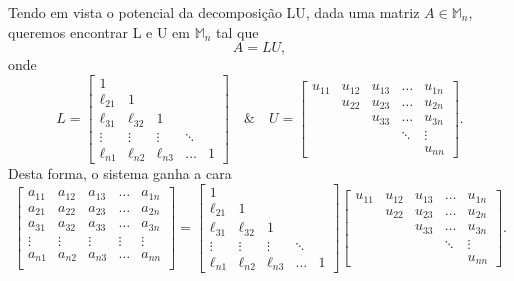 \documentclass[../numerical_methods.tex]{subfiles}
\begin{document}
Tendo em vista o potencial da decomposição LU, dada uma matriz \(A\in \mathbb{M}_{n}\), queremos encontrar L e U em \(\mathbb{M}_{n}\) tal que
\[
	A = LU,
\]
onde
\[
	L = \begin{bmatrix}
		1         &           &           &        &   \\
		\ell_{21} & 1         &           &        &   \\
		\ell_{31} & \ell_{32} & 1         &        &   \\
		\vdots    & \vdots    & \vdots    & \ddots &   \\
		\ell_{n1} & \ell_{n2} & \ell_{n3} & \dotsc & 1
	\end{bmatrix} \quad\&\quad U = \begin{bmatrix}
		u_{11} & u_{12} & u_{13} & \dotsc & u_{1n} \\
		       & u_{22} & u_{23} & \dotsc & u_{2n} \\
		       &        & u_{33} & \dotsc & u_{3n} \\
		       &        &        & \ddots & \vdots \\
		       &        &        &        & u_{nn}
	\end{bmatrix}.
\]
Desta forma, o sistema ganha a cara
\[
	\begin{bmatrix}
		a_{11} & a_{12} & a_{13} & \dotsc & a_{1n} \\
		a_{21} & a_{22} & a_{23} & \dotsc & a_{2n} \\
		a_{31} & a_{32} & a_{33} & \dotsc & a_{3n} \\
		\vdots & \vdots & \vdots & \vdots & \vdots \\
		a_{n1} & a_{n2} & a_{n3} & \dotsc & a_{nn} \\
	\end{bmatrix} =\begin{bmatrix}
		1         &           &           &        &   \\
		\ell_{21} & 1         &           &        &   \\
		\ell_{31} & \ell_{32} & 1         &        &   \\
		\vdots    & \vdots    & \vdots    & \ddots &   \\
		\ell_{n1} & \ell_{n2} & \ell_{n3} & \dotsc & 1
	\end{bmatrix} \begin{bmatrix}
		u_{11} & u_{12} & u_{13} & \dotsc & u_{1n} \\
		       & u_{22} & u_{23} & \dotsc & u_{2n} \\
		       &        & u_{33} & \dotsc & u_{3n} \\
		       &        &        & \ddots & \vdots \\
		       &        &        &        & u_{nn}
	\end{bmatrix}.
\]
\end{document}
